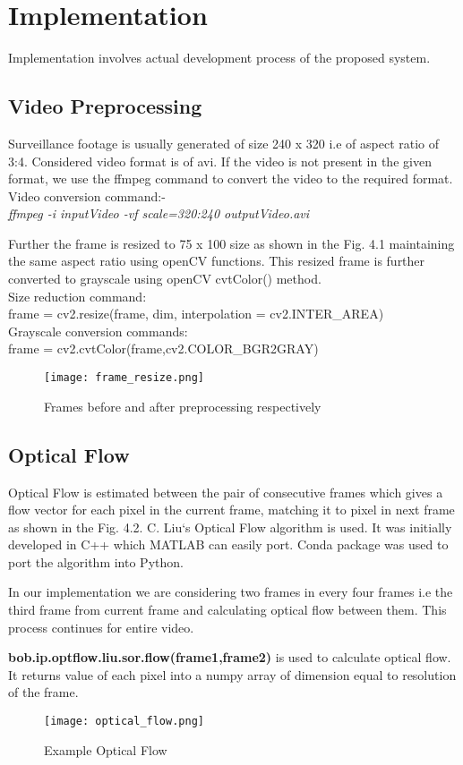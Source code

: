 \chapter{Implementation}
Implementation involves actual development process of the proposed system.
\section{Video Preprocessing}
Surveillance footage is usually generated of size 240 x 320 i.e of aspect ratio of 3:4. Considered video format is of avi. If the video is not present in the given format, we use the ffmpeg command to convert the video to the required format. 
\\
Video conversion command:-\\
\textit{ffmpeg -i {inputVideo} -vf scale=320:240 outputVideo.avi}
\par
Further the frame is resized to 75 x 100 size as shown in the Fig. 4.1 maintaining the same aspect ratio using openCV functions. This resized frame is further converted to grayscale using openCV cvtColor() method. \\
Size reduction command:\\
frame = cv2.resize(frame, dim, interpolation = cv2.INTER\_AREA)\\
Grayscale conversion commands: \\
frame = cv2.cvtColor(frame,cv2.COLOR\_BGR2GRAY)
\begin{center}
\begin{figure}[H]
\centering
\texttt{[image: frame\_resize.png]}
\caption{Frames before and after preprocessing respectively}
\end{figure}
\end{center}
\section{Optical Flow}
Optical Flow is estimated between the pair of consecutive frames which gives a flow vector for each pixel in the current frame, matching it to pixel in next frame as shown in the Fig. 4.2. C. Liu`s Optical Flow algorithm is used. It was initially developed in C++ which MATLAB can easily port. Conda package was used to port the algorithm into Python. \par
	In our implementation we are considering two frames in every four frames i.e the third frame from current frame and calculating optical flow between them. This process continues for entire video. \par \textbf{bob.ip.optflow.liu.sor.flow(frame1,frame2)} is used to calculate optical flow. It returns value of each pixel into a numpy array of dimension equal to resolution of the frame.
\begin{center}
\begin{figure}[H]
\centering
\texttt{[image: optical\_flow.png]}
\caption{Example Optical Flow}
\end{figure}
\end{center}

